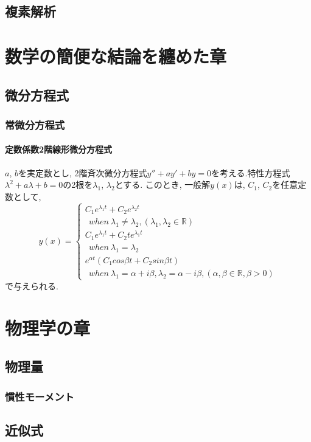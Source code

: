 \documentclass[]{jreport}
\begin{document}
\chapter{複素解析}

\part{数学の簡便な結論を纏めた章}

\chapter{微分方程式}

\section{常微分方程式}
\subsection{定数係数2階線形微分方程式}

$a$, $b$を実定数とし, 2階斉次微分方程式$y''+ay'+by=0$を考える.特性方程式$\lambda^2+a\lambda+b=0$の2根を$\lambda_{1}$, $\lambda_{2}$とする. このとき, 一般解$y(x)$は, $C_{1}$, $C_{2}$を任意定数として, \\
\begin{equation}
    y(x)= \left \{
        \begin{array}{l}
            C_{1}e^{\lambda_{1} t}+C_{2}e^{\lambda_{2} t}\\
            \ \ when \ \lambda_{1}\neq\lambda_{2}, (\lambda_{1}, \lambda_{2}\in\mathbb{R}) \\
            C_{1}e^{\lambda_{1} t}+C_{2}te^{\lambda_{1} t}\\
            \ \ when \ \lambda_{1}=\lambda_{2} \\
            e^{\alpha t}(C_{1}cos{\beta t}+C_{2}sin{\beta t}) \\
            \ \ when \ \lambda_{1}=\alpha+{i\beta}, \lambda_{2}=\alpha-{i\beta}, (\alpha, \beta\in\mathbb{R}, \beta>0)
        \end{array}
    \right.
\end{equation}
で与えられる.

\part{物理学の章}
\chapter{物理量}

\section{慣性モーメント}

\chapter{近似式}
\end{document}
